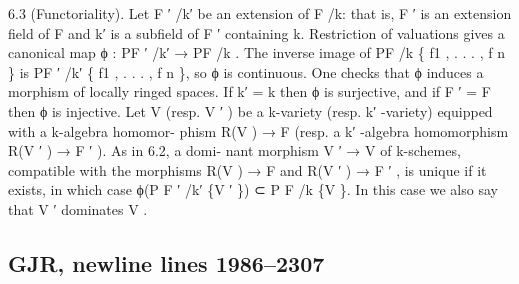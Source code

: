 \documentclass[
  10pt,
]{article}
\newenvironment{Shaded}{}{}
\newcommand{\NormalTok}[1]{#1}
\begin{document}
\begin{Shaded}
\begin{Highlighting}[]
\NormalTok{6.3 (Functoriality). Let F ′ /k′ be an extension of F /k: that is, F ′ is an extension field}
\NormalTok{of F and k′ is a subfield of F ′ containing k. Restriction of valuations gives a canonical}
\NormalTok{map ϕ : PF ′ /k′ → PF /k . The inverse image of PF /k \{ f1 , . . . , f n \} is PF ′ /k′ \{ f1 , . . . , f n \}, so ϕ is}
\NormalTok{continuous. One checks that ϕ induces a morphism of locally ringed spaces. If k′ = k}
\NormalTok{then ϕ is surjective, and if F ′ = F then ϕ is injective.}
\NormalTok{   Let V (resp. V ′ ) be a k{-}variety (resp. k′ {-}variety) equipped with a k{-}algebra homomor{-}}
\NormalTok{phism R(V ) → F (resp. a k′ {-}algebra homomorphism R(V ′ ) → F ′ ). As in 6.2, a domi{-}}
\NormalTok{nant morphism V ′ → V of k{-}schemes, compatible with the morphisms R(V ) → F and}
\NormalTok{R(V ′ ) → F ′ , is unique if it exists, in which case ϕ(P F ′ /k′ \{V ′ \}) ⊂ P F /k \{V \}. In this case we}
\NormalTok{also say that V ′ dominates V .}
\end{Highlighting}
\end{Shaded}

\subsection{GJR, newline lines
1986--2307}\label{gjr-newline-lines-19862307}
\end{document}

